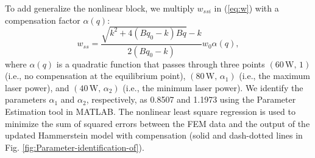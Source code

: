 \documentclass [11pt, proquest] {uwthesis}[2020/02/24]
\begin{document}
To add generalize the nonlinear block, we multiply $w_{ssi}$
in (\ref{eq:w}) with a compensation factor $\alpha(q)$:
\begin{equation}
w_{ss}=\frac{\sqrt{k^{2}+4(Bq_{0}-k)Bq}-k}{2(Bq_{0}-k)}w_{0}\alpha(q),\label{eq:w-1}
\end{equation}
where $\alpha(q)$ is a quadratic function that passes through three
points $(60\,\text{W},\,1)$ (i.e., no compensation at the equilibrium
point), $(80\,\text{W},\,\alpha_{1})$ (i.e., the maximum laser power),
and $(40\,\text{W},\,\alpha_{2})$ (i.e., the minimum laser power).
We identify the parameters $\alpha_{1}$ and $\alpha_{2}$, respectively,
as 0.8507 and 1.1973 using the Parameter Estimation tool in MATLAB.
The nonlinear least square regression is used to minimize the sum
of squared errors between the FEM data and the output of the updated
Hammerstein model with compensation (solid and dash-dotted lines in
Fig. \ref{fig:Parameter-identification-of}).
\end{document}
